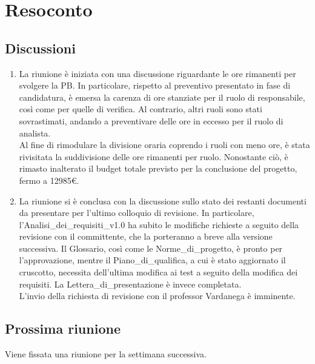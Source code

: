 \section{Resoconto} \label{sec:resoconto}
\subsection{Discussioni} \label{subsec:resdiscussione}
\begin{enumerate}
    \item La riunione è iniziata con una discussione riguardante le ore rimanenti per svolgere la PB. In particolare, rispetto al preventivo presentato in fase di candidatura, è emersa la carenza di ore stanziate per il ruolo di responsabile, così come per quelle di verifica. Al contrario, altri ruoli sono stati sovrastimati, andando a preventivare delle ore in eccesso per il ruolo di analista.\\
    Al fine di rimodulare la divisione oraria coprendo i ruoli con meno ore, è stata rivisitata la suddivisione delle ore rimanenti per ruolo. Nonostante ciò, è rimasto inalterato il budget totale previsto per la conclusione del progetto, fermo a 12985€.

    \item La riunione si è conclusa con la discussione sullo stato dei restanti documenti da presentare per l'ultimo colloquio di revisione. In particolare, l'Analisi\_dei\_requisiti\_v1.0 ha subito le modifiche richieste a seguito della revisione con il committente, che la porteranno a breve alla versione successiva. Il Glossario, così come le Norme\_di\_progetto, è pronto per l'approvazione, mentre il Piano\_di\_qualifica, a cui è stato aggiornato il cruscotto, necessita dell'ultima modifica ai test a seguito della modifica dei requisiti. La Lettera\_di\_presentazione è invece completata.\\
    L'invio della richiesta di revisione con il professor Vardanega è imminente.
    
\end{enumerate}

\subsection{Prossima riunione} \label{subsec:riunione}
Viene fissata una riunione per la settimana successiva.